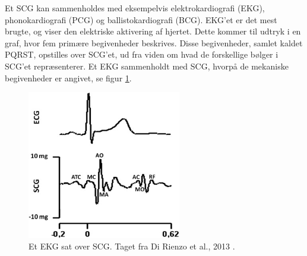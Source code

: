 
Et SCG kan sammenholdes med eksempelvis elektrokardiografi (EKG), phonokardiografi (PCG) og ballistokardiografi (BCG). EKG’et er det mest brugte, og viser den elektriske aktivering af hjertet. Dette kommer til udtryk i en graf, hvor fem primære begivenheder beskrives. Disse begivenheder, samlet kaldet PQRST, opstilles over SCG’et, ud fra viden om hvad de forskellige bølger i SCG’et repræsenterer. Et EKG sammenholdt med SCG, hvorpå de mekaniske begivenheder er angivet, se figur \ref{ecgscg}. \\

\begin{figure}[H]
\centering
  \includegraphics[width=0.6\textwidth]{Billeder/dirienzoetal2013.png}
   \caption{Et EKG sat over SCG. Taget fra Di Rienzo et al., 2013 \cite{di2013wearable}.} 
   \label{ecgscg}
\end{figure}

